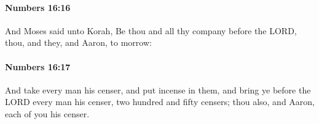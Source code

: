		\paragraph{Numbers 16:16} %
			\label{NUMBERS-16-16}

			And Moses said unto Korah, Be thou and all thy company before the LORD, thou, and they, and Aaron, to morrow:


		\paragraph{Numbers 16:17} %
			\label{NUMBERS-16-17}

			And take every man his censer, and put incense in them, and bring ye before the LORD every man his censer, two hundred and fifty censers; thou also, and Aaron, each of you his censer.


